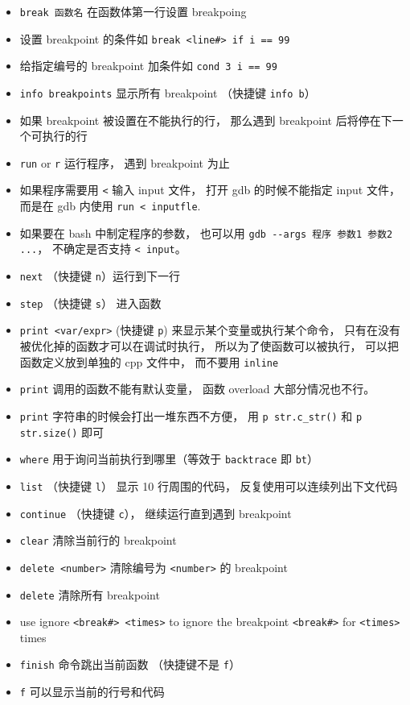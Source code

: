 \begin{itemize}
\item \verb`break 函数名` 在函数体第一行设置 breakpoing
\item 设置 breakpoint 的条件如 \verb`break <line#> if i == 99`
\item 给指定编号的 breakpoint 加条件如 \verb`cond 3 i == 99`
\item \verb`info breakpoints` 显示所有 breakpoint （快捷键 \verb`info b`）
\item 如果 breakpoint 被设置在不能执行的行， 那么遇到 breakpoint 后将停在下一个可执行的行
\item \verb`run` or \verb`r` 运行程序， 遇到 breakpoint 为止
\item 如果程序需要用 \verb`<` 输入 input 文件， 打开 gdb 的时候不能指定 input 文件， 而是在 gdb 内使用 \verb`run < inputfle`.
\item 如果要在 bash 中制定程序的参数， 也可以用 \verb|gdb --args 程序 参数1 参数2 ...|， 不确定是否支持 \verb|< input|。
\item \verb`next` （快捷键 \verb`n`）运行到下一行 
\item \verb`step` （快捷键 \verb`s`） 进入函数
\item \verb`print <var/expr>` (快捷键 \verb`p`) 来显示某个变量或执行某个命令， 只有在没有被优化掉的函数才可以在调试时执行， 所以为了使函数可以被执行， 可以把函数定义放到单独的 cpp 文件中， 而不要用 \verb`inline`
\item \verb`print` 调用的函数不能有默认变量， 函数 overload 大部分情况也不行。
\item \verb`print` 字符串的时候会打出一堆东西不方便， 用 \verb`p str.c_str()` 和 \verb`p str.size()` 即可
\item \verb`where` 用于询问当前执行到哪里（等效于 \verb`backtrace` 即 \verb`bt`）
\item \verb`list` （快捷键 \verb`l`） 显示 10 行周围的代码， 反复使用可以连续列出下文代码
\item \verb`continue` （快捷键 \verb`c`）， 继续运行直到遇到 breakpoint
\item \verb`clear` 清除当前行的 breakpoint
\item \verb`delete <number>` 清除编号为 \verb`<number>` 的 breakpoint
\item \verb`delete` 清除所有 breakpoint
\item use ignore \verb`<break#> <times>` to ignore the breakpoint \verb`<break#>` for \verb`<times>` times
\item \verb`finish` 命令跳出当前函数 （快捷键不是 \verb`f`）
\item \verb`f` 可以显示当前的行号和代码

\end{itemize}
